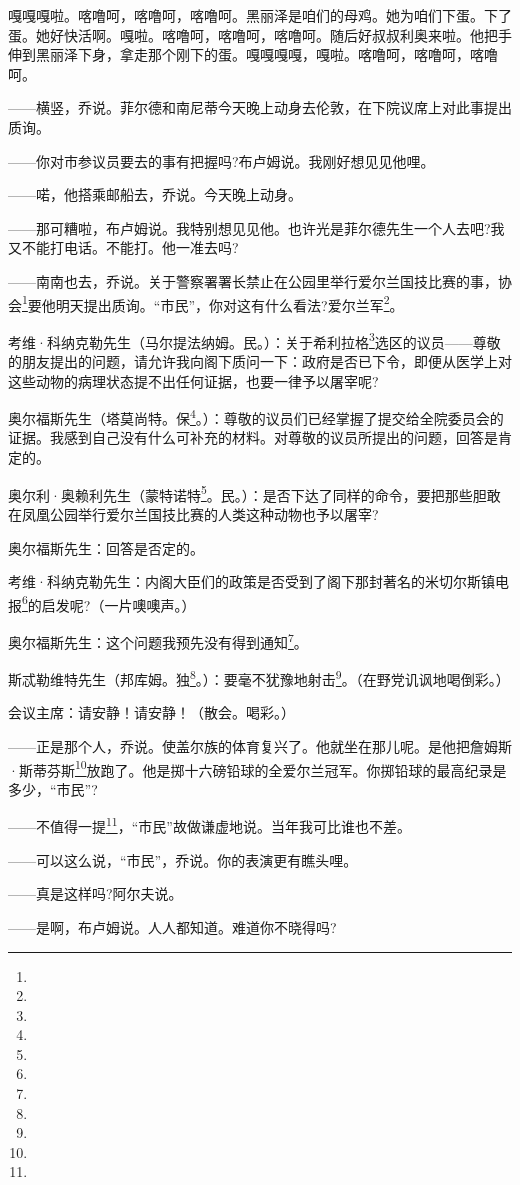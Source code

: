 \par 嘎嘎嘎啦。喀噜呵，喀噜呵，喀噜呵。黑丽泽是咱们的母鸡。她为咱们下蛋。下了蛋。她好快活啊。嘎啦。喀噜呵，喀噜呵，喀噜呵。随后好叔叔利奥来啦。他把手伸到黑丽泽下身，拿走那个刚下的蛋。嘎嘎嘎嘎，嘎啦。喀噜呵，喀噜呵，喀噜呵。
\par ——横竖，乔说。菲尔德和南尼蒂今天晚上动身去伦敦，在下院议席上对此事提出质询。
\par ——你对市参议员要去的事有把握吗?布卢姆说。我刚好想见见他哩。
\par ——喏，他搭乘邮船去，乔说。今天晚上动身。
\par ——那可糟啦，布卢姆说。我特别想见见他。也许光是菲尔德先生一个人去吧?我又不能打电话。不能打。他一准去吗?
\par ——南南也去，乔说。关于警察署署长禁止在公园里举行爱尔兰国技比赛的事，协会\footnote{}要他明天提出质询。“市民”，你对这有什么看法?爱尔兰军\footnote{}。
\par 考维·科纳克勒先生（马尔提法纳姆。民。）：关于希利拉格\footnote{}选区的议员——尊敬的朋友提出的问题，请允许我向阁下质问一下：政府是否已下令，即便从医学上对这些动物的病理状态提不出任何证据，也要一律予以屠宰呢?
\par 奥尔福斯先生（塔莫尚特。保\footnote{}。）：尊敬的议员们已经掌握了提交给全院委员会的证据。我感到自己没有什么可补充的材料。对尊敬的议员所提出的问题，回答是肯定的。
\par 奥尔利·奥赖利先生（蒙特诺特\footnote{}。民。）：是否下达了同样的命令，要把那些胆敢在凤凰公园举行爱尔兰国技比赛的人类这种动物也予以屠宰?
\par 奥尔福斯先生：回答是否定的。
\par 考维·科纳克勒先生：内阁大臣们的政策是否受到了阁下那封著名的米切尔斯镇电报\footnote{}的启发呢?（一片噢噢声。）
\par 奥尔福斯先生：这个问题我预先没有得到通知\footnote{}。
\par 斯忒勒维特先生（邦库姆。独\footnote{}。）：要毫不犹豫地射击\footnote{}。（在野党讥讽地喝倒彩。）
\par 会议主席：请安静！请安静！（散会。喝彩。）
\par ——正是那个人，乔说。使盖尔族的体育复兴了。他就坐在那儿呢。是他把詹姆斯·斯蒂芬斯\footnote{}放跑了。他是掷十六磅铅球的全爱尔兰冠军。你掷铅球的最高纪录是多少，“市民”?
\par ——不值得一提\footnote{}，“市民”故做谦虚地说。当年我可比谁也不差。
\par ——可以这么说，“市民”，乔说。你的表演更有瞧头哩。
\par ——真是这样吗?阿尔夫说。
\par ——是啊，布卢姆说。人人都知道。难道你不晓得吗?
